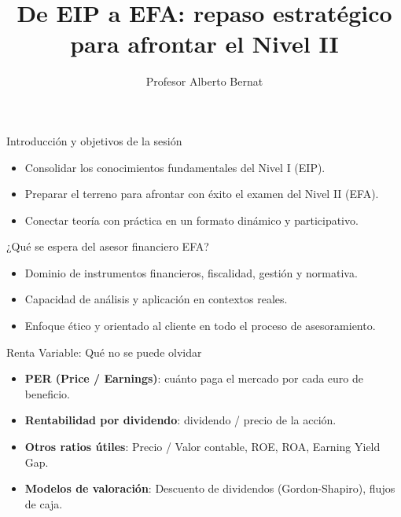 \documentclass[
  ignorenonframetext,
]{beamer}
\title{De EIP a EFA: repaso estratégico para afrontar el Nivel II}
\author{Profesor Alberto Bernat}
\date{}
\providecommand{\tightlist}{%
  \setlength{\itemsep}{0pt}\setlength{\parskip}{0pt}}\usepackage{longtable,booktabs,array}
\begin{document}
\frame{\titlepage}


\begin{frame}{Introducción y objetivos de la sesión}
\label{introducciuxf3n-y-objetivos-de-la-sesiuxf3n}
\begin{itemize}
\tightlist
\item
  Consolidar los conocimientos fundamentales del Nivel I (EIP).
\item
  Preparar el terreno para afrontar con éxito el examen del Nivel II
  (EFA).
\item
  Conectar teoría con práctica en un formato dinámico y participativo.
\end{itemize}
\end{frame}

\begin{frame}{¿Qué se espera del asesor financiero EFA?}
\label{quuxe9-se-espera-del-asesor-financiero-efa}
\begin{itemize}
\tightlist
\item
  Dominio de instrumentos financieros, fiscalidad, gestión y normativa.
\item
  Capacidad de análisis y aplicación en contextos reales.
\item
  Enfoque ético y orientado al cliente en todo el proceso de
  asesoramiento.
\end{itemize}
\end{frame}

\begin{frame}{Renta Variable: Qué no se puede olvidar}
\label{renta-variable-quuxe9-no-se-puede-olvidar}
\begin{itemize}
\tightlist
\item
  \textbf{PER (Price / Earnings)}: cuánto paga el mercado por cada euro
  de beneficio.
\item
  \textbf{Rentabilidad por dividendo}: dividendo / precio de la acción.
\item
  \textbf{Otros ratios útiles}: Precio / Valor contable, ROE, ROA,
  Earning Yield Gap.
\item
  \textbf{Modelos de valoración}: Descuento de dividendos
  (Gordon-Shapiro), flujos de caja.
\end{itemize}
\end{frame}
\end{document}
